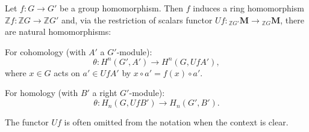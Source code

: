 Let $f: G \to G'$ be a group homomorphism. Then $f$ induces a ring homomorphism $\mathbb{Z}f: \mathbb{Z}G \to \mathbb{Z}G'$ and, via the restriction of scalars functor $Uf: {}_{\mathbb{Z}G'}\mathbf{M} \to {}_{\mathbb{Z}G}\mathbf{M}$, there are natural homomorphisms:

For cohomology (with $A'$ a $G'$-module):
$$\theta: H^n(G', A') \to H^n(G, Uf A'),$$
where $x \in G$ acts on $a' \in Uf A'$ by $x \circ a' = f(x) \circ a'$.

For homology (with $B'$ a right $G'$-module):
$$\theta: H_n(G, Uf B') \to H_n(G', B').$$

The functor $Uf$ is often omitted from the notation when the context is clear.

